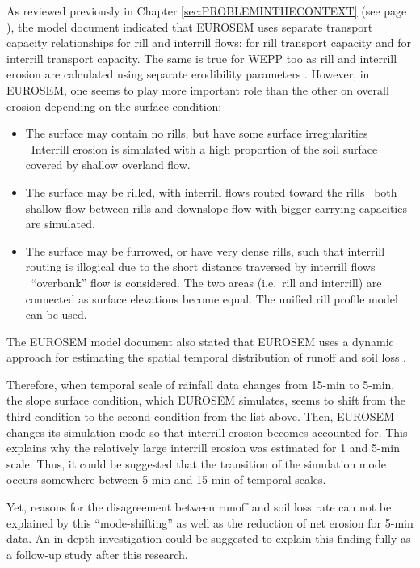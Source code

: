 As reviewed previously in Chapter \ref{sec:PROBLEMINTHECONTEXT} (see page
\pageref{sec:TransportCapacityOfTheFlow}), the model document
indicated that EUROSEM uses separate transport capacity relationships for rill
and interrill flows: \citet{govers1990-45} for rill transport capacity and
\citet{everaert1991-513} for interrill transport capacity. The same is true
for WEPP too as rill and interrill erosion are calculated using separate
erodibility parameters \citep{flanagan1995-usda}. However, in EUROSEM, one seems
to play more important role than the other on overall erosion depending on the
surface condition:

\begin{itemize}
  \item The surface may contain no rills, but have some surface irregularities
    \subitem \textrightarrow\ Interrill erosion is simulated with a high
proportion of the soil surface covered by shallow overland flow.
  \item The surface may be rilled, with interrill flows routed toward the rills
    \subitem \textrightarrow\ both shallow flow between rills and downslope flow
with bigger carrying capacities are simulated.
  \item The surface may be furrowed, or have very dense rills, such that
interrill routing is illogical due to the short distance traversed by interrill
flows
    \subitem \textrightarrow\ ``overbank'' flow is considered. The two areas
(i.e.\ rill and interrill) are connected as surface elevations become equal. The
unified rill profile model can be used.
\end{itemize}

The EUROSEM model document also stated that EUROSEM uses a dynamic approach for
estimating the spatial temporal distribution of runoff and soil loss
\citep{morgan1998-europeansoilerosion}.

Therefore, when temporal scale of rainfall data changes from 15-min to 5-min,
the slope surface condition, which EUROSEM simulates, seems to shift from the
third condition to the second condition from the list above. Then, EUROSEM
changes its simulation mode so that interrill erosion becomes accounted for.
This explains why the relatively large interrill erosion was estimated for 1 and
5-min scale. Thus, it could be suggested that the transition of the simulation
mode occurs somewhere between 5-min and 15-min of temporal scales.

Yet, reasons for the disagreement between runoff and soil loss rate can
not be explained by this ``mode-shifting'' as well as the reduction of net
erosion for 5-min data. An in-depth investigation could be suggested to explain
this finding fully as a follow-up study after this research.

